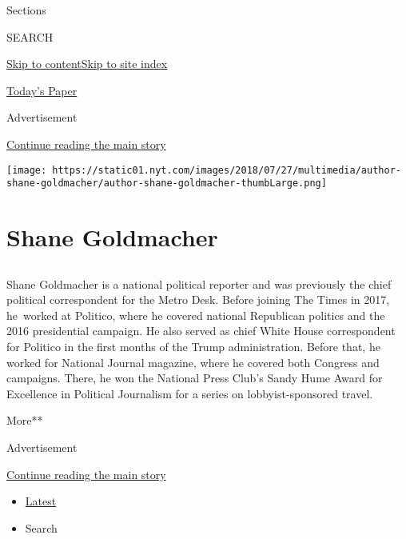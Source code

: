 Sections

SEARCH

\protect\hyperlink{site-content}{Skip to
content}\protect\hyperlink{site-index}{Skip to site index}

\href{https://myaccount.nytimes.com/auth/login?response_type=cookie\&client_id=vi}{}

\href{https://www.nytimes.com/section/todayspaper}{Today's Paper}

Advertisement

\protect\hyperlink{after-top}{Continue reading the main story}

\texttt{[image: https://static01.nyt.com/images/2018/07/27/multimedia/author-shane-goldmacher/author-shane-goldmacher-thumbLarge.png]}

\hypertarget{shane-goldmacher}{%
\section{Shane Goldmacher}\label{shane-goldmacher}}

\subsection{}

Shane Goldmacher is a national political reporter and was previously the
chief political correspondent for the Metro Desk. Before joining The
Times in 2017, he~worked at Politico, where he covered national
Republican politics and the 2016 presidential campaign. He also served
as chief White House correspondent for Politico in the first months of
the Trump administration. Before that, he worked for National Journal
magazine, where he covered both Congress and campaigns. There, he won
the National Press Club's Sandy Hume Award for Excellence in Political
Journalism for a series on lobbyist-sponsored travel.

More**

Advertisement

\protect\hyperlink{after-mid1}{Continue reading the main story}

\begin{itemize}
\tightlist
\item
  \protect\hyperlink{stream-panel}{Latest}
\item
  Search
\end{itemize}


